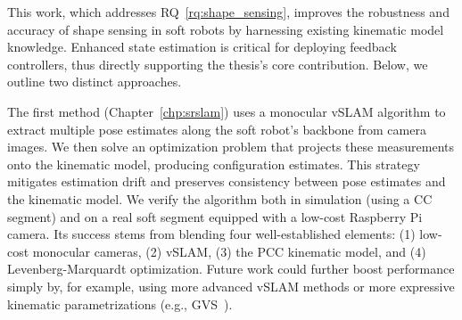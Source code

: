 
This work, which addresses \gls{RQ}~\ref{rq:shape_sensing}, improves the robustness and accuracy of shape sensing in soft robots by harnessing existing kinematic model knowledge. Enhanced state estimation is critical for deploying feedback controllers, thus directly supporting the thesis’s core contribution. Below, we outline two distinct approaches.

The first method (Chapter~\ref{chp:srslam}) uses a monocular \gls{vSLAM} algorithm to extract multiple pose estimates along the soft robot’s backbone from camera images. We then solve an optimization problem that projects these measurements onto the kinematic model, producing configuration estimates. This strategy mitigates estimation drift and preserves consistency between pose estimates and the kinematic model. We verify the algorithm both in simulation (using a \gls{CC} segment) and on a real soft segment equipped with a low-cost Raspberry Pi camera. Its success stems from blending four well-established elements: (1) low-cost monocular cameras, (2) \gls{vSLAM}, (3) the \gls{PCC}\cite{webster2010design} kinematic model, and (4) Levenberg-Marquardt optimization\cite{levenberg1944method, marquardt1963algorithm}. Future work could further boost performance simply by, for example, using more advanced \gls{vSLAM} methods or more expressive kinematic parametrizations (e.g., \gls{GVS}~\cite{renda2020geometric}).

